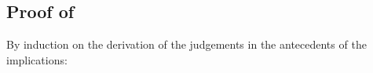 \begin{bycase}

\end{bycase}



\subsection*{Proof of }

By induction on the derivation of the judgements in the antecedents of the
implications:

